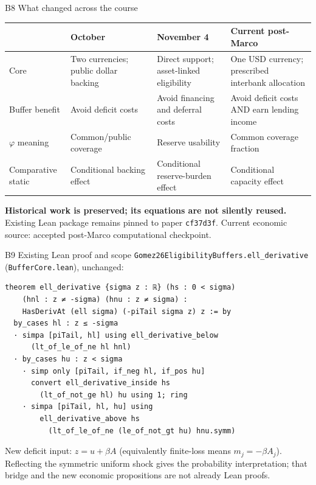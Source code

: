 \documentclass[aspectratio=169,12pt]{beamer}
\begin{document}
\begin{frame}{B8 \textperiodcentered{} What changed across the course}
\relax
{\small\begin{tabular}{@{}>{\raggedright\arraybackslash}p{.18\linewidth}>{\raggedright\arraybackslash}p{.23\linewidth}>{\raggedright\arraybackslash}p{.24\linewidth}>{\raggedright\arraybackslash}p{.25\linewidth}@{}}
\toprule & October & November 4 & Current post-Marco\\ \midrule
Core & Two currencies; public dollar backing & Direct support; asset-linked eligibility &
One USD currency; prescribed interbank allocation\\[7pt]
Buffer benefit & Avoid deficit costs & Avoid financing and deferral costs &
Avoid deficit costs AND earn lending income\\[7pt]
$\varphi$ meaning & Common/public coverage & Reserve usability & Common coverage fraction\\[7pt]
Comparative static & Conditional backing effect & Conditional reserve-burden effect &
Conditional capacity effect\\ \bottomrule
\end{tabular}}
\par\medskip
\textbf{Historical work is preserved; its equations are not silently reused.}\\
{\small Existing Lean package remains pinned to paper \texttt{cf37d3f}.
Current economic source: accepted post-Marco computational checkpoint.}
\end{frame}

\begin{frame}[fragile]{B9 \textperiodcentered{} Existing Lean proof and scope}
\relax
{\footnotesize \texttt{Gomez26EligibilityBuffers.ell\_derivative}
(\texttt{BufferCore.lean}), unchanged:}
{\fontsize{8.8}{10.2}\selectfont
\begin{verbatim}
theorem ell_derivative {sigma z : ℝ} (hs : 0 < sigma)
    (hnl : z ≠ -sigma) (hnu : z ≠ sigma) :
    HasDerivAt (ell sigma) (-piTail sigma z) z := by
  by_cases hl : z ≤ -sigma
  · simpa [piTail, hl] using ell_derivative_below
      (lt_of_le_of_ne hl hnl)
  · by_cases hu : z < sigma
    · simp only [piTail, if_neg hl, if_pos hu]
      convert ell_derivative_inside hs
        (lt_of_not_ge hl) hu using 1; ring
    · simpa [piTail, hl, hu] using
        ell_derivative_above hs
          (lt_of_le_of_ne (le_of_not_gt hu) hnu.symm)
\end{verbatim}
}
{\small New deficit input: $z=u+\beta A$
(equivalently finite-loss means $m_j=-\beta A_j$).\\
Reflecting the symmetric uniform shock gives the probability interpretation;
that bridge and the new economic propositions are not already Lean proofs.}
\end{frame}
\end{document}
